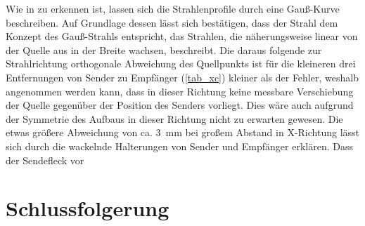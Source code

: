 \documentclass[
	a4paper,
	12pt,
	pagesize,
	ngerman
]{scrartcl}
\begin{document}
	Wie in  zu erkennen ist, lassen sich die Strahlenprofile durch eine Gauß-Kurve beschreiben.
	Auf Grundlage dessen lässt sich bestätigen, dass der Strahl dem Konzept des Gauß-Strahls entspricht, das Strahlen, die näherungsweise linear von der Quelle aus in der Breite wachsen, beschreibt.
	Die daraus folgende zur Strahlrichtung orthogonale Abweichung des Quellpunkts ist für die kleineren drei Entfernungen von Sender zu Empfänger (\cref{tab_xc}) kleiner als der Fehler, weshalb angenommen werden kann, dass in dieser Richtung keine messbare Verschiebung der Quelle gegenüber der Position des Senders vorliegt.
	Dies wäre auch aufgrund der Symmetrie des Aufbaus in dieser Richtung nicht zu erwarten gewesen.
	Die etwas größere Abweichung von ca. \SI{3}{mm} bei großem Abstand in X-Richtung lässt sich durch die wackelnde Halterungen von Sender und Empfänger erklären.
	Dass der Sendefleck vor 
	

	
	\section{Schlussfolgerung}
	
\end{document}
